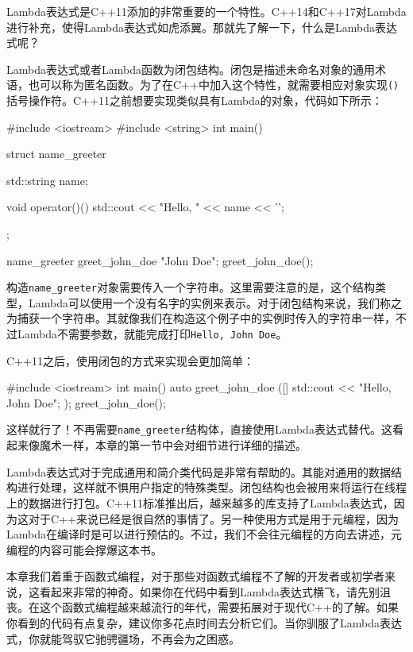Lambda表达式是C++11添加的非常重要的一个特性。C++14和C++17对Lambda进行补充，使得Lambda表达式如虎添翼。那就先了解一下，什么是Lambda表达式呢？

Lambda表达式或者Lambda函数为闭包结构。闭包是描述未命名对象的通用术语，也可以称为匿名函数。为了在C++中加入这个特性，就需要相应对象实现\texttt{()}括号操作符。C++11之前想要实现类似具有Lambda的对象，代码如下所示：

\begin{codebox}[cpp]
#include <iostream>
#include <string>
int main() {
    struct name_greeter {
        std::string name;
        
        void operator()() {
            std::cout << "Hello, " << name << '\n';
        }
    };
    
    name_greeter greet_john_doe {"John Doe"};
    greet_john_doe();
}
\end{codebox}

构造\texttt{name\_greeter}对象需要传入一个字符串。这里需要注意的是，这个结构类型，Lambda可以使用一个没有名字的实例来表示。对于闭包结构来说，我们称之为捕获一个字符串。其就像我们在构造这个例子中的实例时传入的字符串一样，不过Lambda不需要参数，就能完成打印\texttt{Hello, John Doe}。

C++11之后，使用闭包的方式来实现会更加简单：

\begin{codebox}[cpp]
#include <iostream>
int main() {
    auto greet_john_doe ([] {
        std::cout << "Hello, John Doe\n";
    });
    greet_john_doe();
}
\end{codebox}

这样就行了！不再需要\texttt{name\_greeter}结构体，直接使用Lambda表达式替代。这看起来像魔术一样，本章的第一节中会对细节进行详细的描述。

Lambda表达式对于完成通用和简介类代码是非常有帮助的。其能对通用的数据结构进行处理，这样就不惧用户指定的特殊类型。闭包结构也会被用来将运行在线程上的数据进行打包。C++11标准推出后，越来越多的库支持了Lambda表达式，因为这对于C++来说已经是很自然的事情了。另一种使用方式是用于元编程，因为Lambda在编译时是可以进行预估的。不过，我们不会往元编程的方向去讲述，元编程的内容可能会撑爆这本书。

本章我们着重于函数式编程，对于那些对函数式编程不了解的开发者或初学者来说，这看起来非常的神奇。如果你在代码中看到Lambda表达式横飞，请先别沮丧。在这个函数式编程越来越流行的年代，需要拓展对于现代C++的了解。如果你看到的代码有点复杂，建议你多花点时间去分析它们。当你驯服了Lambda表达式，你就能驾驭它驰骋疆场，不再会为之困惑。


